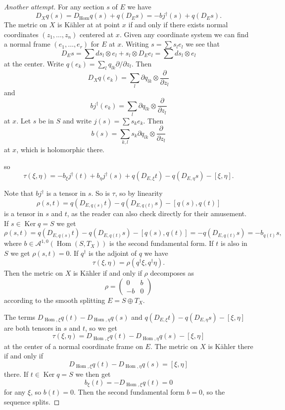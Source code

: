 \documentclass[12pt]{amsart}
\theoremstyle{definition}
\newcommand{\cc}[1]{\mathcal{#1}}
\DeclareMathOperator{\Ker}{Ker}
\DeclareMathOperator{\Hom}{Hom}
\begin{document}
\begin{proof}[Another attempt]
For any section $s$ of $E$ we have 
\[
D_X q(s)
= D_{\Hom}q(s) + q(D_E s)
= - b j^\dagger(s) + q(D_E s).
\]
The metric on $X$ is K\"ahler at at point $x$ if and only if there exists normal coordinates $(z_1,\ldots,z_n)$ centered at $x$.
Given any coordinate system we can find a normal frame $(e_1,\ldots,e_r)$ for $E$ at $x$.
Writing $s = \sum s_l e_l$ we see that
\[
D_E s 
= \sum ds_l \otimes e_l + s_l \otimes D_E e_l
= \sum ds_l \otimes e_l
\]
at the center.
Write $q(e_k) = \sum_l q_{lk} \partial / \partial z_l$.
Then
\[
D_X q(e_k)
= \sum_l \partial q_{lk} \otimes \frac{\partial}{\partial z_l}
\]
and
\[
b j^\dagger(e_k)
= \sum_l \partial q_{lk} \otimes \frac{\partial}{\partial z_l}
\]
at $x$.
Let $s$ be in $S$ and write $j(s) = \sum s_k e_k$.
Then
\[
b(s)
= \sum_{k,l} s_k \partial q_{lk} \otimes \frac{\partial}{\partial z_l}
\]
at $x$, which is holomorphic there.

so
\[
\tau(\xi, \eta)
= - b_{\xi} j^\dagger(t)
+ b_{\eta} j^\dagger(s)
+ q(D_{E,\xi} t)
- q(D_{E,\eta} s)
- [\xi, \eta].
\]

Note that $bj^\dagger$ is a tensor in $s$.
So is $\tau$, so by linearity 
\[
\rho(s,t)
= q(D_{E,q(s)} t)
- q(D_{E,q(t)} s)
- [q(s), q(t)]
\]
is a tensor in $s$ and $t$, as the reader can also check directly for their amusement.
If $s \in \Ker q = S$ we get
\[
\rho(s, t)
= q(D_{E,q(s)} t)
- q(D_{E,q(t)} s)
- [q(s), q(t)]
= - q(D_{E,q(t)} s)
= - b_{q(t)} s,
\]
where $b \in \cc A^{1,0}(\Hom(S,T_X))$ is the second fundamental form.
If $t$ is also in $S$ we get $\rho(s,t) = 0$.
If $q^\dagger$ is the adjoint of $q$ we have
\[
\tau(\xi, \eta) = \rho(q^\dagger \xi, q^\dagger \eta).
\]
Then the metric on $X$ is K\"ahler if and only if $\rho$ decomposes as
\[
\rho = \begin{pmatrix}
0 & b
\\
-b & 0
\end{pmatrix}
\]
according to the smooth splitting $E = S \oplus T_X$.

The terms $D_{\Hom,\xi}q (t) - D_{\Hom,\eta}q (s)$ and $q(D_{E,\xi} t) - q(D_{E,\eta} s) - [\xi, \eta]$ are both tensors in $s$ and $t$, so we get
\[
\tau(\xi, \eta)
= D_{\Hom,\xi}q (t) 
- D_{\Hom,\eta}q (s) 
- [\xi, \eta]
\]
at the center of a normal coordinate frame on $E$.
The metric on $X$ is K\"ahler there if and only if
\[
D_{\Hom,\xi}q (t) 
- D_{\Hom,\eta}q (s) 
= [\xi, \eta]
\]
there.
If $t \in \Ker q = S$ we then get
\[
b_\xi(t) 
= - D_{\Hom, \xi} q(t)
= 0
\]
for any $\xi$, so $b(t) = 0$.
Then the second fundamental form $b = 0$, so the sequence splits.
\end{proof}
\end{document}
